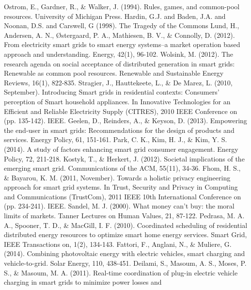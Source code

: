 \documentclass[a4paper]{article}
\begin{document}
\begin{thebibliography}{9}

	Ostrom, E., Gardner, R., \& Walker, J. (1994). Rules, games, and common-pool resources. University of Michigan Press.
 Hardin, G.J. and Baden, J.A. and Noonan, D.S. and Carswell, G (1998). The Tragedy of the Commons
	Lund, H., Andersen, A. N., Østergaard, P. A., Mathiesen, B. V., \& Connolly, D. (2012). 
	From electricity smart grids to smart energy systems–a market operation based approach and understanding. Energy, 42(1), 96-102.
Wolsink, M. (2012). The research agenda on social acceptance of distributed generation in smart grids: Renewable as common pool 
resources. Renewable and Sustainable Energy Reviews, 16(1), 822-835.
Stragier, J., Hauttekeete, L., \& De Marez, L. (2010, September). Introducing Smart grids in residential contexts: Consumers' perception of Smart household appliances. In Innovative Technologies for an Efficient and Reliable Electricity Supply (CITRES), 2010 IEEE Conference on (pp. 135-142). IEEE.
Geelen, D., Reinders, A., \& Keyson, D. (2013). Empowering the end-user in smart grids: Recommendations for the design of products and services. Energy Policy, 61, 151-161.
 Park, C. K., Kim, H. J., \& Kim, Y. S. (2014). A study of factors enhancing smart grid consumer engagement. Energy Policy, 72, 211-218.
Kostyk, T., \& Herkert, J. (2012). Societal implications of the emerging smart grid. Communications of the ACM, 55(11), 34-36.
Fhom, H. S., \& Bayarou, K. M. (2011, November). Towards a holistic privacy engineering approach for smart grid systems. In Trust, Security and Privacy in Computing and Communications (TrustCom), 2011 IEEE 10th International Conference on (pp. 234-241). IEEE.
Sandel, M. J. (2000). What money can't buy: the moral limits of markets. Tanner Lectures on Human Values, 21, 87-122.
Pedrasa, M. A. A., Spooner, T. D., \& MacGill, I. F. (2010). Coordinated scheduling of residential distributed energy resources to optimize smart home energy services. 
Smart Grid, IEEE Transactions on, 1(2), 134-143.
Fattori, F., Anglani, N., \& Muliere, G. (2014). Combining photovoltaic energy with electric vehicles, smart charging and vehicle-to-grid. Solar Energy, 110, 438-451.
Deilami, S., Masoum, A. S., Moses, P. S., \& Masoum, M. A. (2011). Real-time coordination of plug-in electric vehicle charging in smart grids to minimize power losses and 

\end{thebibliography}
\end{document}
